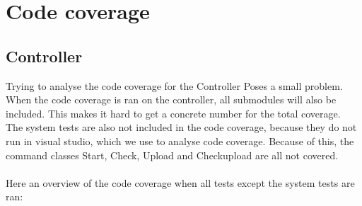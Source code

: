 \documentclass[./Main.tex]{subfiles}
\begin{document}
\section{Code coverage}
\tocless\subsection{Controller}
Trying to analyse the code coverage for the Controller Poses a small problem. When the code coverage is ran on the controller, all submodules will also be included. This makes it hard to get a concrete number for the total coverage.\\
The system tests are also not included in the code coverage, because they do not run in visual studio, which we use to analyse code coverage. Because of this, the command classes Start, Check, Upload and Checkupload are all not covered.\\\\
Here an overview of the code coverage when all tests except the system tests are ran:\\
\end{document}
